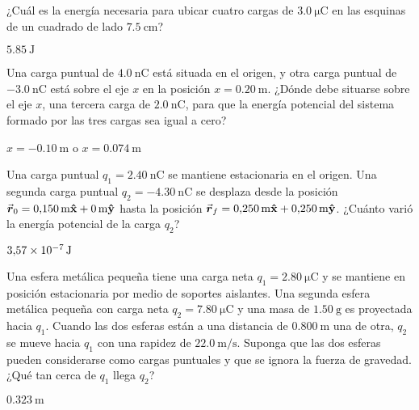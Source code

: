 \setcounter{figure}{0}
%
\begin{Exercise}
  ¿Cuál es la energía necesaria para ubicar cuatro cargas de $\SI{3.0}{\micro\coulomb}$ en las esquinas de un cuadrado de lado $\SI{7.5}{\centi\metre}$?
\end{Exercise}
\begin{Answer}
  $\SI{5.85}{\joule}$
\end{Answer}
%
\begin{Exercise}
  Una carga puntual de $\SI{4.0}{\nano\coulomb}$ está situada en el origen, y otra carga puntual de $\SI{-3.0}{\nano\coulomb}$ está sobre el eje $x$ en la posición $x = \SI{0.20}{\metre}$. ¿Dónde debe situarse sobre el eje $x$, una tercera carga de $\SI{2.0}{\nano\coulomb}$, para que la energía potencial del sistema formado por las tres cargas sea igual a cero?
\end{Exercise}
\begin{Answer}
	\begin{minipage}[t]{.4\textwidth}
    $x = \SI{-0.10}{\metre}$ o $x = \SI{0.074}{\metre}$
  \end{minipage}
\end{Answer}
%
\begin{Exercise}
  Una carga puntual $q_1 = \SI{2.40}{\nano\coulomb}$ se mantiene estacionaria en el origen. Una segunda carga puntual $q_2 = \SI{-4.30}{\nano\coulomb}$ se desplaza desde la posición $\va*{r}_0 =\SI{0.150}{\metre}\vu{x} + \SI{0}{\metre}\vu{y}$ hasta la posición $\va*{r}_f =\SI{0.250}{\metre}\vu{x} + \SI{0.250}{\metre}\vu{y}$. ¿Cuánto varió la energía potencial de la carga $q_2$?
\end{Exercise}
\begin{Answer}
  $\SI{3.57E-7}{\joule}$
\end{Answer}
%
\begin{Exercise}
  Una esfera metálica pequeña tiene una carga neta $q_1 = \SI{2.80}{\micro\coulomb}$ y se mantiene en posición estacionaria por medio de soportes aislantes. Una segunda esfera metálica pequeña con carga neta $q_2 = \SI{7.80}{\micro\coulomb}$ y una masa de $\SI{1.50}{\gram}$ es proyectada hacia $q_1$. Cuando las dos esferas están a una distancia de $\SI{0.800}{\metre}$ una de otra, $q_2$ se mueve hacia $q_1$ con una rapidez de $\SI{22.0}{\metre/\second}$. Suponga que las dos esferas pueden considerarse como cargas puntuales y que se ignora la fuerza de gravedad. ¿Qué tan cerca de $q_1$ llega $q_2$?
\end{Exercise}
\begin{Answer}
  $\SI{0.323}{\metre}$
\end{Answer}

